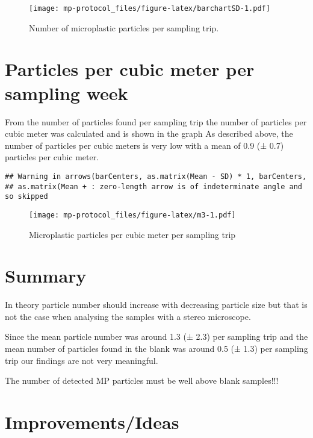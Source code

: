 \documentclass[
  icelandic,
]{book}
\begin{document}
\begin{figure}
\centering
\texttt{[image: mp-protocol\_files/figure-latex/barchartSD-1.pdf]}
\caption{\label{fig:barchartSD}Number of microplastic particles per sampling trip.}
\end{figure}

\hypertarget{particles-per-cubic-meter-per-sampling-week}{%
\section{Particles per cubic meter per sampling week}\label{particles-per-cubic-meter-per-sampling-week}}

From the number of particles found per sampling trip the number of particles per cubic meter was calculated and is shown in the graph
As described above, the number of particles per cubic meters is very low with a mean of 0.9 (± 0.7) particles per cubic meter.

\begin{verbatim}
## Warning in arrows(barCenters, as.matrix(Mean - SD) * 1, barCenters,
## as.matrix(Mean + : zero-length arrow is of indeterminate angle and so skipped
\end{verbatim}

\begin{figure}
\centering
\texttt{[image: mp-protocol\_files/figure-latex/m3-1.pdf]}
\caption{\label{fig:m3}Microplastic particles per cubic meter per sampling trip}
\end{figure}

\hypertarget{summary}{%
\section{Summary}\label{summary}}

In theory particle number should increase with decreasing particle size but that is not the case when analysing the samples with a stereo microscope.

Since the mean particle number was around 1.3 (± 2.3) per sampling trip and the mean number of particles found in the blank was around 0.5 (± 1.3) per sampling trip our findings are not very meaningful.

The number of detected MP particles must be well above blank samples!!!

\hypertarget{improvementsideas}{%
\section{Improvements/Ideas}\label{improvementsideas}}
\end{document}
